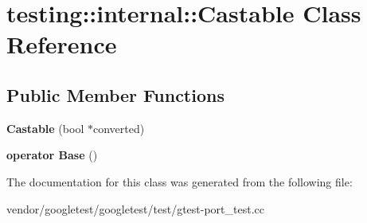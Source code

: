 \hypertarget{classtesting_1_1internal_1_1_castable}{}\section{testing\+:\+:internal\+:\+:Castable Class Reference}
\label{classtesting_1_1internal_1_1_castable}
\subsection*{Public Member Functions}
\begin{DoxyCompactItemize}
\item 
\mbox{\label{classtesting_1_1internal_1_1_castable_a705d519a227d38ff5c174905316f62c4}} 
{\bfseries Castable} (bool $\ast$converted)
\item 
\mbox{\label{classtesting_1_1internal_1_1_castable_ac60b2e7885f3b09defb829eddaa0afd9}} 
{\bfseries operator Base} ()
\end{DoxyCompactItemize}


The documentation for this class was generated from the following file\+:\begin{DoxyCompactItemize}
\item 
vendor/googletest/googletest/test/gtest-\/port\+\_\+test.\+cc\end{DoxyCompactItemize}
